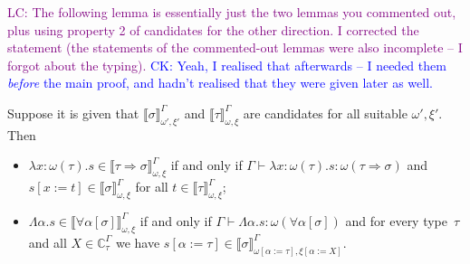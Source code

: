 \documentclass[runningheads,a4paper]{llncs}
\newcommand{\quant}[2]{\forall #1[#2]}
\newcommand{\arrtype}{\Rightarrow}
\newcommand{\abs}[2]{\lambda #1.#2}
\newcommand{\tabs}[2]{\Lambda #1.#2}
\newcommand{\subst}[2]{#1:=#2}
\newcommand{\Cb}{\mathbb{C}}
\newcommand{\val}[3]{\ensuremath{\llbracket#1\rrbracket_{#2}^{#3}}}
\newcommand{\proves}{\vdash}
\newcommand{\CK}[1]{\textcolor{blue}{CK: #1}}
\newcommand{\LC}[1]{\textcolor{purple}{LC: #1}}
\begin{document}
\LC{The following lemma is essentially just the two lemmas you
  commented out, plus using property 2 of candidates for the other
  direction. I corrected the statement (the statements of the
  commented-out lemmas were also incomplete -- I forgot about the
  typing).}
\CK{Yeah, I realised that afterwards -- I needed them \emph{before}
  the main proof, and hadn't realised that they were given later
  as well.}
\begin{lemma}\label{lem_abstraction_computable}
  Suppose it is given that $\val{\sigma}{\omega',\xi'}{\Gamma}$ and
  $\val{\tau}{\omega,\xi}{\Gamma}$ are candidates for all suitable
  $\omega',\xi'$.  Then
  \begin{itemize}
  \item
    $\abs{x:\omega(\tau)}{s} \in \val{\tau \arrtype
      \sigma}{\omega,\xi}{ \Gamma}$ if and only if
    $\Gamma \proves \abs{x:\omega(\tau)}{s} : \omega(\tau \arrtype
    \sigma)$ and $s[x:=t] \in \val{\sigma}{\omega,\xi}{\Gamma}$ for
    all $t \in \val{ \tau}{\omega,\xi}{\Gamma}$;
  \item
    $\tabs{\alpha}{s} \in \val{\quant{\alpha}{\sigma}}{\omega,\xi}{
      \Gamma}$ if and only if
    $\Gamma \proves \tabs{\alpha}{s} : \omega(\quant{\alpha}{\sigma})$
    and for every type~$\tau$ and all $X \in \Cb_\tau^\Gamma$ we have
    $s[\alpha:=\tau] \in
    \val{\sigma}{\omega[\subst{\alpha}{\tau}],\xi[\subst{\alpha}{X}]}{\Gamma}$.
  \end{itemize}
\end{lemma}
\end{document}
